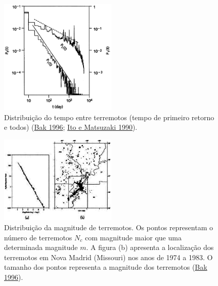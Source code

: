 \documentclass[
  ignorenonframetext,
  aspectratio=169]{beamer}
\begin{document}
\begin{frame}
\begin{figure}
\centering
\includegraphics[width=0.5\textwidth,height=\textheight]{bak-earthquakes.png}
\caption{Distribuição do tempo entre terremotos (tempo de primeiro
retorno e todos) (\protect\hyperlink{ref-perbak}{Bak 1996};
\protect\hyperlink{ref-ito1990earthquakes}{Ito e Matsuzaki 1990}).}
\end{figure}
\end{frame}

\begin{frame}
\begin{figure}
\centering
\includegraphics[width=0.5\textwidth,height=\textheight]{bak-earthquakes2.png}
\caption{Distribuição da magnitude de terremotos. Os pontos representam
o número de terremotos \(N_c\) com magnitude maior que uma determinada
magnitude \(m\). A figura (b) apresenta a localização dos terremotos em
Nova Madrid (Missouri) nos anos de 1974 a 1983. O tamanho dos pontos
representa a magnitude dos terremotos
(\protect\hyperlink{ref-perbak}{Bak 1996}).}
\end{figure}
\end{frame}
\end{document}

